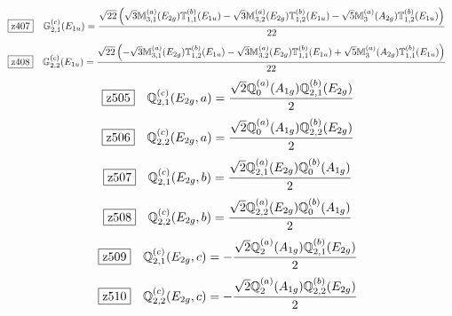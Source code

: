 \documentclass[fleqn,10pt,landscape]{jsarticle}
\begin{document}
\begin{dmath*}
\hspace*{3mm}\fbox{z407}\quad \mathbb{G}_{2,1}^{(c)}(E_{1u})=\frac{\sqrt{22} \left(\sqrt{3} \mathbb{M}_{3,1}^{(a)}(E_{2g}) \mathbb{T}_{1,1}^{(b)}(E_{1u}) - \sqrt{3} \mathbb{M}_{3,2}^{(a)}(E_{2g}) \mathbb{T}_{1,2}^{(b)}(E_{1u}) - \sqrt{5} \mathbb{M}_{3}^{(a)}(A_{2g}) \mathbb{T}_{1,2}^{(b)}(E_{1u})\right)}{22}
\end{dmath*}
\begin{dmath*}
\hspace*{3mm}\fbox{z408}\quad \mathbb{G}_{2,2}^{(c)}(E_{1u})=\frac{\sqrt{22} \left(- \sqrt{3} \mathbb{M}_{3,1}^{(a)}(E_{2g}) \mathbb{T}_{1,2}^{(b)}(E_{1u}) - \sqrt{3} \mathbb{M}_{3,2}^{(a)}(E_{2g}) \mathbb{T}_{1,1}^{(b)}(E_{1u}) + \sqrt{5} \mathbb{M}_{3}^{(a)}(A_{2g}) \mathbb{T}_{1,1}^{(b)}(E_{1u})\right)}{22}
\end{dmath*}
\begin{dmath*}
\hspace*{3mm}\fbox{z505}\quad \mathbb{Q}_{2,1}^{(c)}(E_{2g},a)=\frac{\sqrt{2} \mathbb{Q}_{0}^{(a)}(A_{1g}) \mathbb{Q}_{2,1}^{(b)}(E_{2g})}{2}
\end{dmath*}
\begin{dmath*}
\hspace*{3mm}\fbox{z506}\quad \mathbb{Q}_{2,2}^{(c)}(E_{2g},a)=\frac{\sqrt{2} \mathbb{Q}_{0}^{(a)}(A_{1g}) \mathbb{Q}_{2,2}^{(b)}(E_{2g})}{2}
\end{dmath*}
\begin{dmath*}
\hspace*{3mm}\fbox{z507}\quad \mathbb{Q}_{2,1}^{(c)}(E_{2g},b)=\frac{\sqrt{2} \mathbb{Q}_{2,1}^{(a)}(E_{2g}) \mathbb{Q}_{0}^{(b)}(A_{1g})}{2}
\end{dmath*}
\begin{dmath*}
\hspace*{3mm}\fbox{z508}\quad \mathbb{Q}_{2,2}^{(c)}(E_{2g},b)=\frac{\sqrt{2} \mathbb{Q}_{2,2}^{(a)}(E_{2g}) \mathbb{Q}_{0}^{(b)}(A_{1g})}{2}
\end{dmath*}
\begin{dmath*}
\hspace*{3mm}\fbox{z509}\quad \mathbb{Q}_{2,1}^{(c)}(E_{2g},c)=- \frac{\sqrt{2} \mathbb{Q}_{2}^{(a)}(A_{1g}) \mathbb{Q}_{2,1}^{(b)}(E_{2g})}{2}
\end{dmath*}
\begin{dmath*}
\hspace*{3mm}\fbox{z510}\quad \mathbb{Q}_{2,2}^{(c)}(E_{2g},c)=- \frac{\sqrt{2} \mathbb{Q}_{2}^{(a)}(A_{1g}) \mathbb{Q}_{2,2}^{(b)}(E_{2g})}{2}
\end{dmath*}
\end{document}
